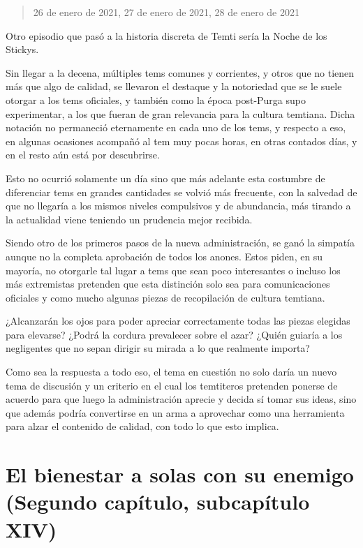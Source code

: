 \documentclass[
  spanish,
]{book}
\begin{document}
\begin{quote}
26 de enero de 2021, 27 de enero de 2021, 28 de enero de 2021
\end{quote}

Otro episodio que pasó a la historia discreta de Temti sería la Noche de los Stickys.

Sin llegar a la decena, múltiples tems comunes y corrientes, y otros que no tienen más que algo de calidad, se llevaron el destaque y la notoriedad que se le suele otorgar a los tems oficiales, y también como la época post-Purga supo experimentar, a los que fueran de gran relevancia para la cultura temtiana.
Dicha notación no permaneció eternamente en cada uno de los tems, y respecto a eso, en algunas ocasiones acompañó al tem muy pocas horas, en otras contados días, y en el resto aún está por descubrirse.

Esto no ocurrió solamente un día sino que más adelante esta costumbre de diferenciar tems en grandes cantidades se volvió más frecuente, con la salvedad de que no llegaría a los mismos niveles compulsivos y de abundancia, más tirando a la actualidad viene teniendo un prudencia mejor recibida.

Siendo otro de los primeros pasos de la nueva administración, se ganó la simpatía aunque no la completa aprobación de todos los anones. Estos piden, en su mayoría, no otorgarle tal lugar a tems que sean poco interesantes o incluso los más extremistas pretenden que esta distinción solo sea para comunicaciones oficiales y como mucho algunas piezas de recopilación de cultura temtiana.

¿Alcanzarán los ojos para poder apreciar correctamente todas las piezas elegidas para elevarse? ¿Podrá la cordura prevalecer sobre el azar? ¿Quién guiaría a los negligentes que no sepan dirigir su mirada a lo que realmente importa?

Como sea la respuesta a todo eso, el tema en cuestión no solo daría un nuevo tema de discusión y un criterio en el cual los temtiteros pretenden ponerse de acuerdo para que luego la administración aprecie y decida sí tomar sus ideas, sino que además podría convertirse en un arma a aprovechar como una herramienta para alzar el contenido de calidad, con todo lo que esto implica.

\hypertarget{el-bienestar-a-solas-con-su-enemigo-segundo-capuxedtulo-subcapuxedtulo-xiv}{%
\section{El bienestar a solas con su enemigo (Segundo capítulo, subcapítulo XIV)}\label{el-bienestar-a-solas-con-su-enemigo-segundo-capuxedtulo-subcapuxedtulo-xiv}}
\end{document}
